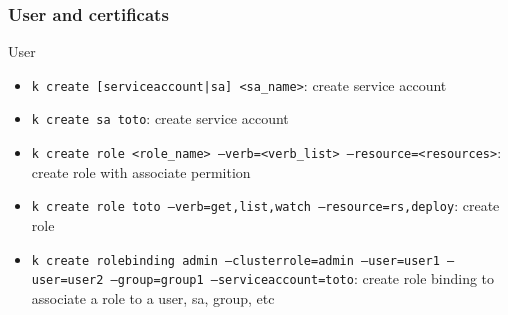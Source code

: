
\subsubsection{User and certificats}
\begin{frame}[fragile]{User}
  \begin{itemize}
    \item \texttt{k create [serviceaccount|sa] <sa\_name>}: create service account
    \item \texttt{k create sa toto}: create service account
    \item \texttt{k create role <role\_name> --verb=<verb\_list> --resource=<resources>}: create role with associate permition
    \item \texttt{k create role toto --verb=get,list,watch --resource=rs,deploy}: create role
    \item \texttt{k create rolebinding admin --clusterrole=admin --user=user1 --user=user2 --group=group1 --serviceaccount=toto}: create role binding to associate a role to a user, sa, group, etc
  \end{itemize}
  \begin{lstlisting}
  \end{lstlisting}
\end{frame}
